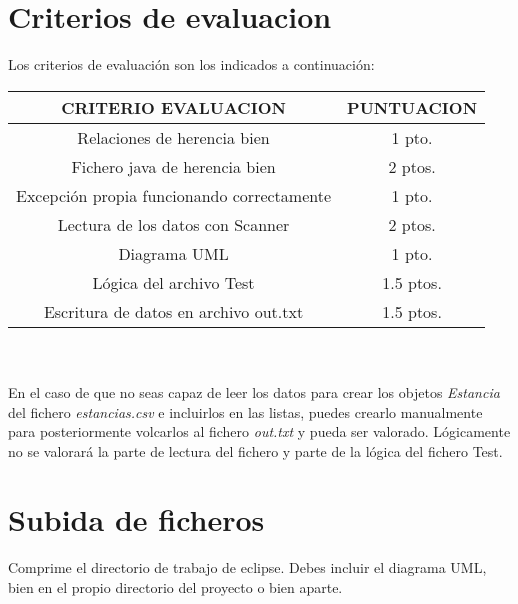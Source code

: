 \documentclass[4paper]{article}
\begin{document}
\section*{Criterios de evaluacion}
Los criterios de evaluación son los indicados a continuación:\par 
\vspace*{0.5cm}
\begin{tabular}{|c|c|}
\hline
\textbf{CRITERIO EVALUACION} & \textbf{PUNTUACION} \\
\hline
Relaciones de herencia bien & 1 pto.\\
\hline
Fichero java de herencia bien & 2 ptos. \\
\hline
Excepción propia funcionando correctamente & 1 pto.\\
\hline
Lectura de los datos con Scanner & 2 ptos.\\
\hline 
Diagrama UML & 1 pto.\\
\hline
Lógica del archivo Test & 1.5 ptos.\\
\hline
Escritura de datos en archivo out.txt & 1.5 ptos.\\
\hline
\end{tabular}
\\
\\
En el caso de que no seas capaz de leer los datos para crear los objetos \emph{Estancia} del fichero \emph{estancias.csv} e incluirlos en las listas, puedes crearlo manualmente para posteriormente volcarlos al fichero \emph{out.txt} y pueda ser valorado. Lógicamente no se valorará la parte de lectura del fichero y parte de la lógica del fichero Test.
\section*{Subida de ficheros}
Comprime el directorio de trabajo de eclipse. Debes incluir el diagrama UML, bien en el propio directorio del proyecto o bien aparte. 
\end{document}
